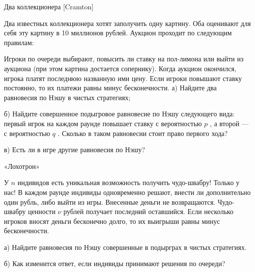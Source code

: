 \begin{problem}
 Два коллекционера [Cramton]\par
Два известных коллекционера хотят заполучить одну картину. Оба оценивают для себя эту картину в 10 миллионов рублей. Аукцион проходит по следующим правилам:\par
Игроки по очереди выбирают, повысить ли ставку на пол-лимона или выйти из аукциона (при этом картина достается сопернику). Когда аукцион окончился,  игрока платят последнюю названную ими цену. Если игроки повышают ставку постоянно, то их платежи равны минус бесконечности.
а) Найдите два равновесия по Нэшу в чистых стратегиях;\par
б) Найдите совершенное подыгровое равновесие по Нэшу следующего вида: первый игрок на каждом раунде повышает ставку с вероятностью  $p$ , а второй — с вероятностью  $q$ . Сколько в таком равновесии стоит право первого хода?\par
в) Есть ли в игре другие равновесия по Нэшу?


\begin{sol}

\end{sol}
\end{problem}




\begin{problem}
 «Лохотрон»\par
У  $n$  индивидов есть уникальная возможность получить чудо-швабру! Только у нас! В каждом раунде индивиды одновременно решают, внести ли дополнительно один рубль, либо выйти из игры. Внесенные деньги не возвращаются. Чудо-швабру ценности  $\nu $  рублей получает последний оставшийся. Если несколько игроков вносят деньги бесконечно долго, то их выигрыши равны минус бесконечности.\par
а) Найдите равновесия по Нэшу совершенные в подырграх в чистых стратегиях.\par
б) Как изменится ответ, если индивиды принимают решения по очереди?\par



\begin{sol}

\end{sol}
\end{problem}



